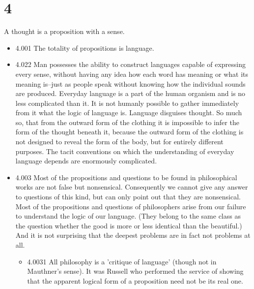 \documentclass[11pt]{article}
\begin{document}
\section*{4}
\label{sec:orgdafa17d}
A thought is a proposition with a sense.
\begin{itemize}
\item 4.001
\label{sec:orgdabfe81}
The totality of propositions is language.
\item 4.022
\label{sec:org8a83e95}
Man possesses the ability to construct languages capable of
expressing every sense, without having any idea how each word has meaning
or what its meaning is--just as people speak without knowing how the
individual sounds are produced. Everyday language is a part of the human
organism and is no less complicated than it. It is not humanly possible to
gather immediately from it what the logic of language is. Language
disguises thought. So much so, that from the outward form of the clothing
it is impossible to infer the form of the thought beneath it, because the
outward form of the clothing is not designed to reveal the form of the
body, but for entirely different purposes. The tacit conventions on which
the understanding of everyday language depends are enormously complicated.
\item 4.003
\label{sec:orgf3ea532}
Most of the propositions and questions to be found in philosophical
works are not false but nonsensical. Consequently we cannot give any answer
to questions of this kind, but can only point out that they are
nonsensical. Most of the propositions and questions of philosophers arise
from our failure to understand the logic of our language. (They belong to
the same class as the question whether the good is more or less identical
than the beautiful.) And it is not surprising that the deepest problems are
in fact not problems at all.
\begin{itemize}
\item 4.0031
\label{sec:org32a9fb1}
All philosophy is a 'critique of language' (though not in Mauthner's
sense). It was Russell who performed the service of showing that the
apparent logical form of a proposition need not be its real one.
\end{itemize}
\end{itemize}
\end{document}
